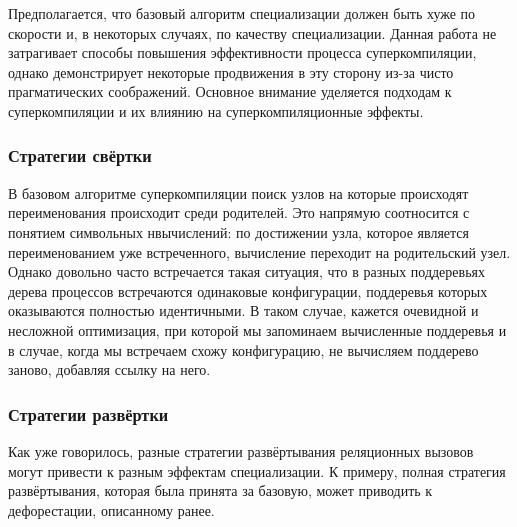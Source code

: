 Предполагается, что базовый алгоритм специализации должен быть хуже по
скорости и, в некоторых случаях, по качеству специализации.
Данная работа не затрагивает способы повышения эффективности процесса
суперкомпиляции, однако демонстрирует некоторые продвижения в эту сторону
из-за чисто прагматических соображений. Основное внимание уделяется
подходам к суперкомпиляции и их влиянию на суперкомпиляционные эффекты.

\subsubsection{Стратегии свёртки}

В базовом алгоритме суперкомпиляции поиск узлов на которые происходят переименования
происходит среди родителей. Это напрямую соотносится с понятием символьных
нвычислений: по достижении узла, которое является переименованием уже встреченного,
вычисление переходит на родительский узел. Однако довольно часто встречается
такая ситуация,
что в разных поддеревьях дерева процессов встречаются одинаковые конфигурации,
поддеревья которых оказываются полностью идентичными. В таком случае, кажется
очевидной и несложной оптимизация, при которой мы запоминаем вычисленные
поддеревья и в случае, когда мы встречаем схожу конфигурацию, не вычисляем
поддерево заново, добавляя ссылку на него.



\subsubsection{Стратегии развёртки}

Как уже говорилось, разные стратегии развёртывания реляционных вызовов могут
привести к разным эффектам специализации. К примеру, полная стратегия развёртывания,
которая была принята за базовую, может приводить к дефорестации, описанному ранее.

